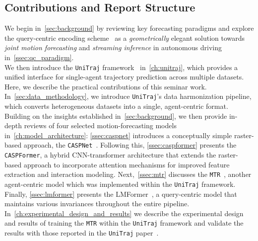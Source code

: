 \subsection{Contributions and Report Structure}
 We begin in~\autoref{sec:background} by reviewing key forecasting paradigms and explore the query-centric encoding scheme~\cite{qcnetZhou2023} as a \emph{geometrically} elegant solution towards \emph{joint motion forecasting} and \emph{streaming inference} in autonomous driving in~\autoref{ssec:qc_paradigm}.\\
 We then introduce the \texttt{UniTraj} framework~\cite{unitrajFeng2024} in~\autoref{ch:unitraj}, which provides a unified interface for single-agent trajectory prediction across multiple datasets. Here, we describe the practical contributions of this seminar work.\\
In~\autoref{sec:data_methodology}, we introduce \texttt{UniTraj}'s data harmonization pipeline, which converts heterogeneous datasets into a single, agent-centric format.\\
Building on the insights established in~\autoref{sec:background},
we then provide in-depth reviews of four selected motion-forecasting models in~\autoref{ch:model_architecture}:
\autoref{ssec:caspnet} introduces a conceptually simple raster-based approach, the \texttt{CASPNet}~\cite{caspnetSchäfer2022}. Following this, \autoref{ssec:caspformer} presents the \texttt{CASPFormer}, a hybrid CNN-transformer architecture that extends the raster-based approach to incorporate attention mechanisms for improved feature extraction and interaction modeling.
Next,~\autoref{ssec:mtr} discusses the \texttt{MTR}~\cite{Shi2022MTR}, another agent-centric model which was implemented within the \texttt{UniTraj} framework.
Finally, \autoref{ssec:lmformer} presents the LMFormer~\cite{lmformerYadav2025}, a query-centric model that maintains various invariances throughout the entire pipeline.\\
In~\autoref{ch:experimental_design_and_results} we describe the experimental design and results of training the \texttt{MTR} within the \texttt{UniTraj} framework and validate the results with those reported in the \texttt{UniTraj} paper~\cite{unitrajFeng2024}.

\newpage